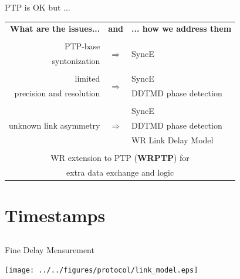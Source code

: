 \documentclass[compress,red]{beamer}
\begin{document}
\begin{frame}{PTP is OK but ...}

  \resizebox{11cm}{!} 
  {
    \begin{tabular}{ r c l }
  {\bf What are the issues...} 	& {\bf and}      & {\bf ... how we address them}  \\
				&     		 &        \\
      PTP-base		 	& \multirow{2}{*}{$\Rightarrow$}  & \multirow{2}{*}{SyncE }\\
      syntonization	        &      		 &        \\
				&      		 &        			\\
      limited             	&\multirow{2}{*}{$\Rightarrow$}  	 & SyncE \\
      precision and resolution  &      		 & DDTMD phase detection\\
				&    		 &        \\
			        &      		 & SyncE  \\
      unknown link asymmetry    & $\Rightarrow$  & DDTMD phase detection \\
				&      		 & WR Link Delay Model \\
				&      		 &        \\
      \multicolumn{3}{c}{WR extension to PTP ({\bf WRPTP}) for } \\
      \multicolumn{3}{c}{extra data exchange and logic} \\
    \end{tabular}
  }
\end{frame}
\section{Timestamps}
\subsection{}
\begin{frame}{Fine Delay Measurement}

  \begin{center}
  \texttt{[image: ../../figures/protocol/link\_model.eps]}
  \end{center}

\end{frame}
\end{document}
